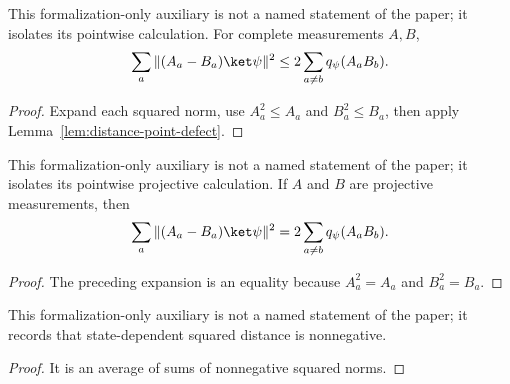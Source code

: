 \begin{lemma}
	\label{lem:distance-point-distance-le-defect}
	\leanok
	This formalization-only auxiliary is not a named statement of the paper; it
	isolates its pointwise calculation. For complete measurements $A,B$,
	\[
		\sum_a\|(A_a-B_a)\ket\psi\|^2
		\leq 2\sum_{a\ne b}q_\psi(A_aB_b).
	\]
\end{lemma}
\begin{proof}
	\leanok
	Expand each squared norm, use $A_a^2\leq A_a$ and $B_a^2\leq B_a$,
	then apply Lemma~\ref{lem:distance-point-defect}.
\end{proof}

\begin{lemma}
	\label{lem:distance-projective-point-distance}
	\leanok
	This formalization-only auxiliary is not a named statement of the paper; it
	isolates its pointwise projective calculation. If $A$ and $B$ are
	projective measurements, then
	\[
		\sum_a\|(A_a-B_a)\ket\psi\|^2
		=2\sum_{a\ne b}q_\psi(A_aB_b).
	\]
\end{lemma}
\begin{proof}
	\leanok
	The preceding expansion is an equality because $A_a^2=A_a$ and
	$B_a^2=B_a$.
\end{proof}

\begin{lemma}
	\label{lem:distance-nonnegative}
	\leanok
	This formalization-only auxiliary is not a named statement of the paper; it
	records that state-dependent squared distance is nonnegative.
\end{lemma}
\begin{proof}
	\leanok
	It is an average of sums of nonnegative squared norms.
\end{proof}

